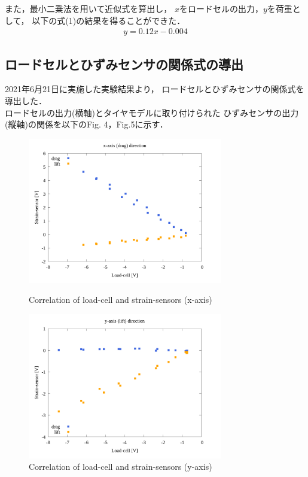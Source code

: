 \documentclass[twocolumn,a4j]{jsarticle}
\begin{document}
また，最小二乗法を用いて近似式を算出し，
$x$をロードセルの出力，$y$を荷重として，
以下の式(1)の結果を得ることができた．
\begin{eqnarray}
    y = 0.12 x - 0.004
\end{eqnarray}

\subsection{ロードセルとひずみセンサの関係式の導出}
2021年6月21日に実施した実験結果より，
ロードセルとひずみセンサの関係式を導出した．\\
ロードセルの出力(横軸)とタイヤモデルに取り付けられた
ひずみセンサの出力(縦軸)の関係を以下のFig. 4，Fig.5に示す．
\begin{figure}[htbp]
    \footnotesize
    \begin{center}
        \includegraphics[width=85mm]{../images/05_strainsensor-loadcell_x.png}
        \caption{Correlation of load-cell and strain-sensors (x-axis)}
        \includegraphics[width=85mm]{../images/06_strainsensor-loadcell_y.png}
        \caption{Correlation of load-cell and strain-sensors (y-axis)}
    \end{center}
\end{figure}

\newpage
\end{document}
